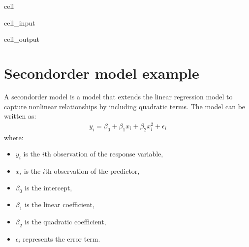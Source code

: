 \documentclass[letterpaper,10pt,english]{jupyterBook}
\begin{document}
\begin{sphinxuseclass}{cell}
\begin{sphinxVerbatimInput}
\begin{sphinxuseclass}{cell_input}
\end{sphinxuseclass}\end{sphinxVerbatimInput}
\begin{sphinxVerbatimOutput}

\begin{sphinxuseclass}{cell_output}
\noindent{}

\end{sphinxuseclass}\end{sphinxVerbatimOutput}

\end{sphinxuseclass}

\section{Second\sphinxhyphen{}order model example}
\label{\detokenize{notebooks/review_linear_models:second-order-model-example}}
\sphinxAtStartPar
A second\sphinxhyphen{}order model is a model that extends the linear regression model to capture non\sphinxhyphen{}linear relationships by including quadratic terms. The model can be written as:
\begin{equation*}
\begin{split}
y_i = \beta_0 + \beta_1 x_i + \beta_2 x_i^2 + \epsilon_i
\end{split}
\end{equation*}
\sphinxAtStartPar
where:
\begin{itemize}
\item {} 
\sphinxAtStartPar
\(y_i\) is the \(i\)\sphinxhyphen{}th observation of the response variable,

\item {} 
\sphinxAtStartPar
\(x_i\) is the \(i\)\sphinxhyphen{}th observation of the predictor,

\item {} 
\sphinxAtStartPar
\(\beta_0\) is the intercept,

\item {} 
\sphinxAtStartPar
\(\beta_1\) is the linear coefficient,

\item {} 
\sphinxAtStartPar
\(\beta_2\) is the quadratic coefficient,

\item {} 
\sphinxAtStartPar
\(\epsilon_i\) represents the error term.

\end{itemize}
\end{document}
